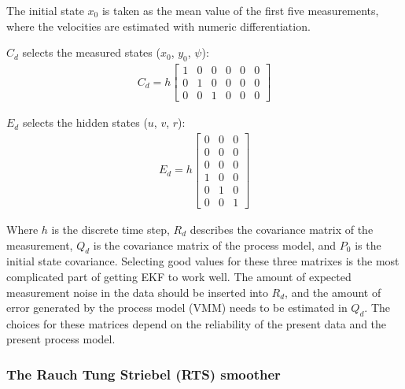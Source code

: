 \documentclass[review]{elsarticle}
\begin{document}
The initial state \(x_0\) is taken as the mean value of the first five measurements, where the velocities are estimated with numeric differentiation.

  
\(C_d\) selects the measured states (\(x_0\), \(y_0\), \(\psi\)):
\begin{equation}\label{equation:04.01_EK:eqcd}
\begin{split}\displaystyle C_{d} = h \left[\begin{matrix}1 & 0 & 0 & 0 & 0 & 0\\0 & 1 & 0 & 0 & 0 & 0\\0 & 0 & 1 & 0 & 0 & 0\end{matrix}\right]\end{split}
\end{equation}
  
\(E_d\) selects the hidden states (\(u\), \(v\), \(r\)):
\begin{equation}\label{equation:04.01_EK:eqed}
\begin{split}\displaystyle E_{d} = h \left[\begin{matrix}0 & 0 & 0\\0 & 0 & 0\\0 & 0 & 0\\1 & 0 & 0\\0 & 1 & 0\\0 & 0 & 1\end{matrix}\right]\end{split}
\end{equation}
  
Where \(h\) is the discrete time step, \(R_d\) describes the covariance matrix of the measurement, \(Q_d\) is the covariance matrix of the process model, and \(P_0\) is the initial state covariance.
Selecting good values for these three matrixes is the most complicated part of getting EKF to work well. The amount of expected measurement noise in the data should be inserted into \(R_d\), and the amount of error generated by the process model (VMM) needs to be estimated in \(Q_d\). The choices for these matrices depend on the reliability of the present data and the present process model.


\subsubsection{The Rauch Tung Striebel (RTS) smoother}
\label{\detokenize{04.01_EK:rauch-tung-striebel-rts-smoother}}\label{\detokenize{04.01_EK:rts}}
  
\end{document}
